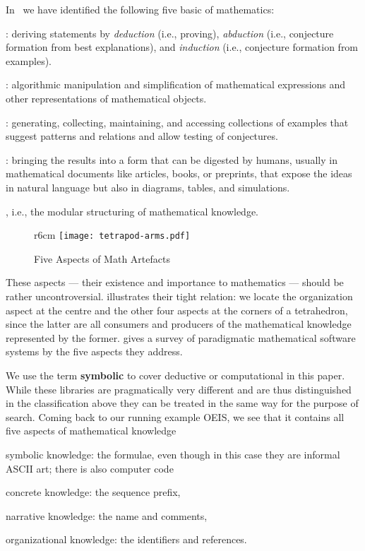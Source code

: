 In~\cite{CarFarKohRab:bmobb19} we have identified the following five basic  of mathematics:
\begin{compactenum}[\em i\rm)]
\item {}: deriving statements by \emph{deduction} (i.e., proving), \emph{abduction} (i.e., conjecture formation from best explanations), and \emph{induction} (i.e., conjecture formation from examples).
\item {}: algorithmic manipulation and simplification of mathematical expressions and other representations of mathematical objects.
\item {}: generating, collecting, maintaining, and accessing collections of examples that suggest patterns and relations and allow testing of conjectures.
\item {}: bringing the results into a form that can be digested by humans, usually in mathematical documents like articles, books, or preprints, that expose the ideas in natural language but also in diagrams, tables, and simulations.
\item {}, i.e., the modular structuring of mathematical knowledge.
\end{compactenum}

\begin{wrapfigure}r{6cm}\vspace*{-2em}
\texttt{[image: tetrapod-arms.pdf]}\vspace*{-.5em}
\caption{Five Aspects of Math Artefacts}\label{fig:tetrapod}\vspace*{-1em}
\end{wrapfigure}
These aspects --- their existence and importance to mathematics --- should be rather uncontroversial. 
 illustrates their tight relation: we locate the organization aspect at the centre and the other four aspects at the corners of a tetrahedron, since the latter are all consumers and producers of the mathematical knowledge represented by the former. \cite{CarFarSharBerKohMueRab:somss20} gives a survey of paradigmatic mathematical software systems by the five aspects they address. 

We use the term \textbf{symbolic} to cover deductive or computational in this paper.
While these libraries are pragmatically very different and are thus distinguished in the classification above they can be treated in the same way for the purpose of search.
Coming back to our running example OEIS, we see that it contains all five aspects of mathematical knowledge
\begin{compactenum}
\item symbolic knowledge: the formulae, even though in this case they are informal ASCII art; there is also computer code 
\item concrete knowledge: the sequence prefix,
\item narrative knowledge: the name and comments,
\item organizational knowledge: the identifiers and references. 
\end{compactenum}\medskip

